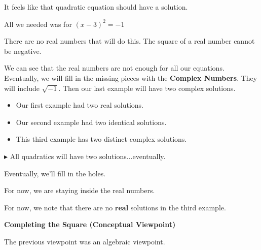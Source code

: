 \documentclass{ximera}
\begin{document}
It feels like that quadratic equation should have a solution.  


All we needed was for $(x-3)^2 = -1$ 

There are no real numbers that will do this.  The square of a real number cannot be negative. 




We can see that the real numbers are not enough for all our equations.  Eventually, we will fill in the missing pieces with the \textbf{Complex Numbers}.  They will include $\sqrt{-1}$.  Then our last example will have two complex solutions.  


\begin{itemize}
\item Our first example had two real solutions.  
\item Our second example had two identical solutions.  
\item This third example has two distinct complex solutions. 
\end{itemize}



$\blacktriangleright$ All quadratics will have two solutions...eventually. 

Eventually, we'll fill in the holes.









For now, we are staying inside the real numbers.



For now, we note that there are no \textbf{real} solutions in the third example.
































\textbf{\textcolor{blue!55!black}{Completing the Square (Conceptual Viewpoint)}} 






The previous viewpoint was an algebraic viewpoint.  
\end{document}
